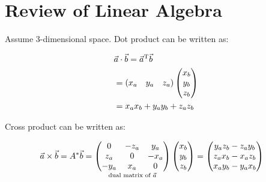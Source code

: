 
% 



\section{Review of Linear Algebra}

Assume 3-dimensional space. Dot product can be written as:

$$\begin{aligned}
    &\vec{a}\cdot\vec{b} = \vec{a}^\mathrm{T}\vec{b} \\
    &=(x_a\quad y_a\quad z_a)\begin{pmatrix}x_b\\y_b\\z_b\end{pmatrix} \\
    &=x_ax_b+y_ay_b+z_az_b
\end{aligned}$$

Cross product can be written as:

$$\begin{aligned}
    &\vec{a}\times\vec{b} = A^*\vec{b} = \underset{\text{dual matrix of}\,\,\vec{a}}{\begin{pmatrix}
        0 & -z_a & y_a \\
        z_a & 0 & -x_a \\
        -y_a & x_a & 0
    \end{pmatrix}}\begin{pmatrix}
        x_b \\
        y_b \\
        z_b
    \end{pmatrix}=\begin{pmatrix}y_az_b-z_ay_b\\z_ax_b-x_az_b\\x_ay_b-y_ax_b\end{pmatrix}
\end{aligned}$$



% 
